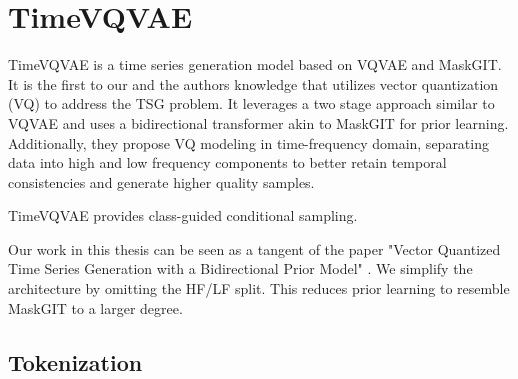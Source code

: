 \documentclass[../../thesis.tex]{subfiles}
\begin{document}





\section{TimeVQVAE}

TimeVQVAE is a time series generation model based on VQVAE and MaskGIT. It is the first to our and the authors knowledge that utilizes vector quantization (VQ) to address the TSG problem. It leverages a two stage approach similar to VQVAE and uses a bidirectional transformer akin to MaskGIT for prior learning. Additionally, they propose VQ modeling in time-frequency domain, separating data into high and low frequency components to better retain temporal consistencies and generate higher quality samples.\newline

TimeVQVAE provides class-guided conditional sampling.

Our work in this thesis can be seen as a tangent of the paper "Vector Quantized Time Series Generation with a Bidirectional Prior Model" \cite{TimeVQVAE}. We simplify the architecture by omitting the HF/LF split. This reduces prior learning to resemble MaskGIT to a larger degree. 


\subsection{Tokenization}
\end{document}
